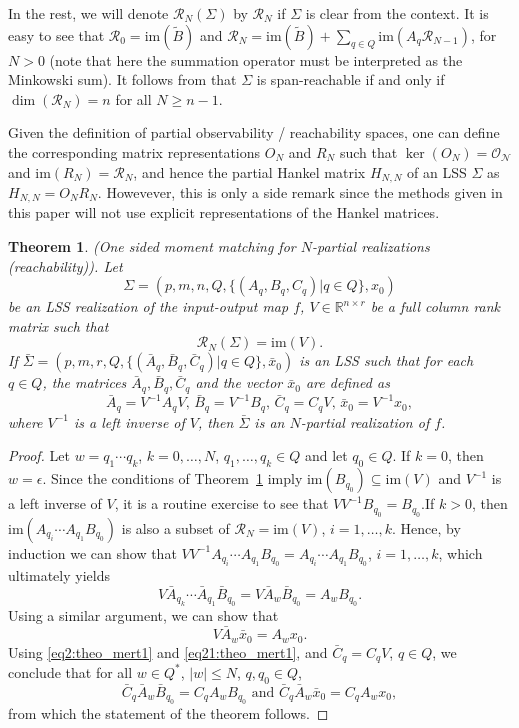\documentclass[journal]{IEEEtran}
\newcommand{\IM}{\mathrm{im}}
\newtheorem{Theorem}{Theorem}
\begin{document}
In the rest, we will denote $\mathscr{R}_N(\Sigma)$ by $\mathscr{R}_N$ if $\Sigma$ is clear from the context. It is easy to see that $\mathscr{R}_0=\IM (\widetilde{B})$ and $\mathscr{R}_{N}=\IM (\widetilde{B})+\sum_{q \in Q} \IM (A_q\mathscr{R}_{N-1})$, for $N > 0$ (note that here the summation operator must be interpreted as the Minkowski sum). It follows from \cite{MP:BigArticlePartI,Sun:Book} that $\Sigma$ is span-reachable if and only if $\dim (\mathscr{R}_N)=n$ for all $N \ge n-1$.

Given the definition of partial observability / reachability spaces, one can define the corresponding matrix representations $O_N$ and $R_N$ such that $\ker (O_N)= \mathscr{O_N}$ and $\IM(R_N)=\mathscr{R}_N$, and hence the partial Hankel matrix $H_{N,N}$ of an LSS $\Sigma$ as $H_{N,N}= O_N R_N$. Howevever, this is only a side remark since the methods given in this paper will not use explicit representations of the Hankel matrices.

\begin{Theorem} \label{theo:mert1}
	\emph{(One sided moment matching for $N$-partial realizations (reachability)).}
	Let
	\[
	\Sigma=(p,m,n,Q,\{(A_q,B_q,C_q)|q \in Q\},x_0)
	\]
	be an LSS realization of the input-output map $f$, $V \in \mathbb{R}^{n \times r}$ be a full column rank matrix such that
	\[
	\mathscr{R}_{N}(\Sigma) = \IM (V).
	\]
	If $\bar{\Sigma}=(p,m,r,Q,\{(\bar{A}_q,\bar{B}_q,\bar{C}_q)|q \in Q\},\bar{x}_0)$ is an LSS such that for each $q \in Q$, the matrices $\bar{A}_q,\bar{B}_q,\bar{C}_q$ and the vector $\bar{x}_0$ are defined as
	\[
	\bar{A}_q=V^{-1}A_qV \mbox{, } \bar{B}_q=V^{-1}B_q \mbox{, } \bar{C}_q=C_qV \mbox{, } \bar{x}_0=V^{-1}x_0,
	\]
	where $V^{-1}$ is a left inverse of $V$, 
	then $\bar{\Sigma}$ is an $N$-partial realization of $f$.
\end{Theorem}

\begin{proof}
	Let $w=q_1\cdots q_k$, $k=0,\ldots,N$, $q_1,\ldots,q_k \in Q$ and let $q_0 \in Q$. If $k=0$, then $w=\epsilon$. Since the conditions of Theorem~\ref{theo:mert1} imply $\IM (B_{q_0}) \subseteq \IM (V)$ and $V^{-1}$ is a left inverse of $V$, it is a routine exercise to see that $VV^{-1}B_{q_0}=B_{q_0}$.If $k > 0$, then $\IM (A_{q_i} \cdots A_{q_1}B_{q_0})$ is also a subset of $\mathscr{R}_N=\IM (V)$, $i=1,\ldots,k$. Hence, by induction we can show that 
	$VV^{-1}A_{q_i} \cdots A_{q_1}B_{q_0}=A_{q_i} \cdots A_{q_1}B_{q_0}$, $i=1,\ldots,k$, which ultimately yields
	\begin{equation} \label{eq2:theo_mert1}
		V\bar{A}_{q_{k}}\cdots \bar{A}_{q_1}\bar{B}_{q_0}=V\bar{A}_w\bar{B}_{q_0}=A_wB_{q_0}.
	\end{equation}
	Using a similar argument, we can show that
	\begin{equation} \label{eq21:theo_mert1}
		V\bar{A}_w\bar{x}_0=A_wx_0.
	\end{equation}
	Using \eqref{eq2:theo_mert1} and \eqref{eq21:theo_mert1}, and 
	$\bar{C}_q=C_qV$, $q \in Q$, we conclude that for all $w \in Q^{*}$, $|w| \le N$,
	$q,q_0 \in Q$, 
	\[ 
	\bar{C}_q\bar{A}_w\bar{B}_{q_0}=C_qA_wB_{q_0}
	\mbox{ and }
	\bar{C}_q\bar{A}_w\bar{x}_0 = C_qA_wx_0,
	\]
	from which the statement of the theorem follows.
\end{proof}
\end{document}
